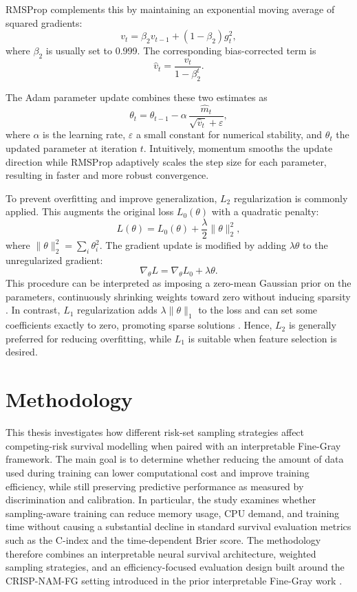 \documentclass[a4paper,twoside,12pt]{report}
\begin{document}
RMSProp complements this by maintaining an exponential moving average of squared gradients:
\[
v_t = \beta_2 v_{t-1} + (1-\beta_2) g_t^2,
\]
where \(\beta_2\) is usually set to 0.999. The corresponding bias-corrected term is
\[
\hat v_t = \frac{v_t}{1-\beta_2^t}.
\]

The Adam parameter update combines these two estimates as
\[
\theta_t = \theta_{t-1} - \alpha\, \frac{\hat m_t}{\sqrt{\hat v_t} + \varepsilon},
\]
where \(\alpha\) is the learning rate, \(\varepsilon\) a small constant for numerical stability, and \(\theta_t\) the updated parameter at iteration \(t\). Intuitively, momentum smooths the update direction while RMSProp adaptively scales the step size for each parameter, resulting in faster and more robust convergence.

To prevent overfitting and improve generalization, \(L_2\) regularization is commonly applied. This augments the original loss \(L_0(\theta)\) with a quadratic penalty:
\[
L(\theta) = L_0(\theta) + \frac{\lambda}{2} \|\theta\|_2^2,
\]
where \(\|\theta\|_2^2 = \sum_i \theta_i^2\). The gradient update is modified by adding \(\lambda \theta\) to the unregularized gradient:
\[
\nabla_\theta L = \nabla_\theta L_0 + \lambda \theta.
\]
This procedure can be interpreted as imposing a zero-mean Gaussian prior on the parameters, continuously shrinking weights toward zero without inducing sparsity \citep{bishop2006}. In contrast, \(L_1\) regularization adds \(\lambda \|\theta\|_1\) to the loss and can set some coefficients exactly to zero, promoting sparse solutions \citep{tibshirani1996}. Hence, \(L_2\) is generally preferred for reducing overfitting, while \(L_1\) is suitable when feature selection is desired.

\chapter{Methodology}


This thesis investigates how different risk-set sampling strategies affect competing-risk survival modelling when paired with an interpretable Fine-Gray framework. The main goal is to determine whether reducing the amount of data used during training can lower computational cost and improve training efficiency, while still preserving predictive performance as measured by discrimination and calibration. In particular, the study examines whether sampling-aware training can reduce memory usage, CPU demand, and training time without causing a substantial decline in standard survival evaluation metrics such as the C-index and the time-dependent Brier score. The methodology therefore combines an interpretable neural survival architecture, weighted sampling strategies, and an efficiency-focused evaluation design built around the CRISP-NAM-FG setting introduced in the prior interpretable Fine-Gray work \cite{InterpretableFineGray2025}.
\end{document}
